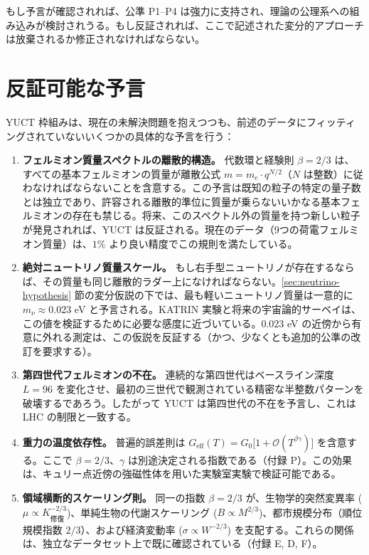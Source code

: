 \documentclass[12pt,a4paper]{article}
\begin{document}
	もし予言が確認されれば、公準 P1--P4 は強力に支持され、理論の公理系への組み込みが検討されうる。もし反証されれば、ここで記述された変分的アプローチは放棄されるか修正されなければならない。
	
	\section{反証可能な予言}
	
	YUCT 枠組みは、現在の未解決問題を抱えつつも、前述のデータにフィッティングされていないいくつかの具体的な予言を行う：
	
	\begin{enumerate}[label=(\arabic*)]
		\item \textbf{フェルミオン質量スペクトルの離散的構造。} 代数環と経験則 \(\beta = 2/3\) は、すべての基本フェルミオンの質量が離散公式 \(m = m_e \cdot q^{N/2}\)（\(N\) は整数）に従わなければならないことを含意する。この予言は既知の粒子の特定の量子数とは独立であり、許容される離散的準位に質量が乗らないいかなる基本フェルミオンの存在も禁じる。将来、このスペクトル外の質量を持つ新しい粒子が発見されれば、YUCT は反証される。現在のデータ（9つの荷電フェルミオン質量）は、\(1\%\) より良い精度でこの規則を満たしている。
		\item \textbf{絶対ニュートリノ質量スケール。} もし右手型ニュートリノが存在するならば、その質量も同じ離散的ラダー上になければならない。\ref{sec:neutrino-hypothesis} 節の変分仮説の下では、最も軽いニュートリノ質量は一意的に \(m_{\nu} \approx 0.023\) eV と予言される。KATRIN 実験と将来の宇宙論的サーベイは、この値を検証するために必要な感度に近づいている。\(0.023\) eV の近傍から有意に外れる測定は、この仮説を反証する（かつ、少なくとも追加的公準の改訂を要求する）。
		\item \textbf{第四世代フェルミオンの不在。} 連続的な第四世代はベースライン深度 \(L = 96\) を変化させ、最初の三世代で観測されている精密な半整数パターンを破壊するであろう。したがって YUCT は第四世代の不在を予言し、これは LHC の制限と一致する。
		\item \textbf{重力の温度依存性。} 普遍的誤差則は \(G_{\mathrm{eff}}(T) = G_0\bigl[1 + \mathcal{O}(T^{\beta\gamma})\bigr]\) を含意する。ここで \(\beta = 2/3\)、\(\gamma\) は別途決定される指数である（付録 P）。この効果は、キュリー点近傍の強磁性体を用いた実験室実験で検証可能である。
		\item \textbf{領域横断的スケーリング則。} 同一の指数 \(\beta = 2/3\) が、生物学的突然変異率 (\(\mu \propto K_{\text{修復}}^{-2/3}\))、単純生物の代謝スケーリング (\(B \propto M^{2/3}\))、都市規模分布（順位規模指数 \(2/3\)）、および経済変動率 (\(\sigma \propto W^{-2/3}\)) を支配する。これらの関係は、独立なデータセット上で既に確認されている（付録 E, D, F）。
	\end{enumerate}
	
\end{document}
